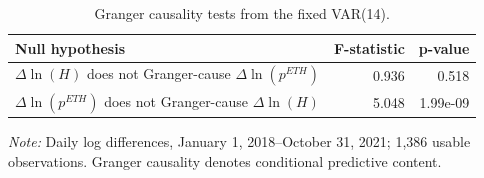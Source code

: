 \begin{table}[htbp]
\centering
\small
\caption{Granger causality tests from the fixed VAR(14).}
\label{tab:granger}
\begin{tabular}{lrr}
\toprule
Null hypothesis & F-statistic & p-value \\
\midrule
$\Delta\ln(H)$ does not Granger-cause $\Delta\ln(p^{ETH})$ & 0.936 & 0.518 \\
$\Delta\ln(p^{ETH})$ does not Granger-cause $\Delta\ln(H)$ & 5.048 & 1.99e-09 \\
\bottomrule
\end{tabular}
\par\smallskip
\begin{minipage}{\linewidth}
\footnotesize
\textit{Note:} Daily log differences, January 1, 2018--October 31, 2021; 1,386 usable observations. Granger causality denotes conditional predictive content.
\end{minipage}
\end{table}

